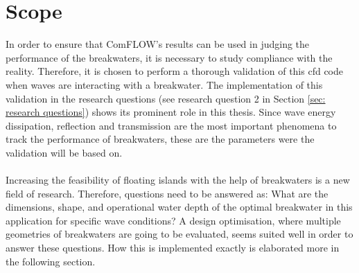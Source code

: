 \section{Scope}
In order to ensure that ComFLOW's results can be used in judging the performance of the breakwaters, it is necessary to study compliance with the reality. Therefore, it is chosen to perform a thorough validation of this \acrshort{cfd} code when waves are interacting with a breakwater. The implementation of this validation in the research questions (see research question 2 in Section \ref{sec: research questions}) shows its prominent role in this thesis. Since wave energy dissipation, reflection and transmission are the most important phenomena to track the performance of breakwaters, these are the parameters were the validation will be based on. \\
\\

Increasing the feasibility of floating islands with the help of breakwaters is a new field of research. Therefore, questions need to be answered as: What are the dimensions, shape, and operational water depth of the optimal breakwater in this application for specific wave conditions? A design optimisation, where multiple geometries of breakwaters are going to be evaluated, seems suited well in order to answer these questions. How this is implemented exactly is elaborated more in the following section.
